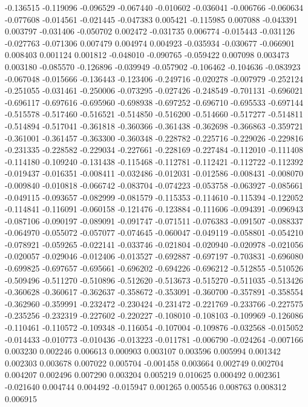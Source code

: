 -0.136515
-0.119096
-0.096529
-0.067440
-0.010602
-0.036041
-0.006766
-0.060634
-0.077608
-0.014561
-0.021445
-0.047383
0.005421
-0.115985
0.007088
-0.043391
0.003797
-0.031406
-0.050702
0.002472
-0.031735
0.006774
-0.015443
-0.031126
-0.027763
-0.071306
0.007479
0.004974
0.004923
-0.035934
-0.030677
-0.066901
0.008403
0.001124
0.001812
-0.048010
-0.090765
-0.059422
0.007098
0.003473
0.003180
-0.085570
-0.126896
-0.039949
-0.057902
-0.106462
-0.104636
-0.083923
-0.067048
-0.015666
-0.136443
-0.123406
-0.249716
-0.020278
-0.007979
-0.252124
-0.251055
-0.031461
-0.250006
-0.073295
-0.027426
-0.248549
-0.701131
-0.696021
-0.696117
-0.697616
-0.695960
-0.698938
-0.697252
-0.696710
-0.695533
-0.697144
-0.515578
-0.517460
-0.516521
-0.514850
-0.516200
-0.514660
-0.517277
-0.514811
-0.514894
-0.517041
-0.361818
-0.360366
-0.361438
-0.362698
-0.366863
-0.359721
-0.361001
-0.361457
-0.363300
-0.360348
-0.228782
-0.225716
-0.229026
-0.229816
-0.231335
-0.228582
-0.229034
-0.227661
-0.228169
-0.227484
-0.112010
-0.111408
-0.114180
-0.109240
-0.131438
-0.115468
-0.112781
-0.112421
-0.112722
-0.112392
-0.019437
-0.016351
-0.008411
-0.032486
-0.012031
-0.012586
-0.008431
-0.008070
-0.009840
-0.010818
-0.066742
-0.083704
-0.074223
-0.053758
-0.063927
-0.085661
-0.049115
-0.093657
-0.082999
-0.081579
-0.115353
-0.114610
-0.115394
-0.122052
-0.114841
-0.116091
-0.060158
-0.121476
-0.123884
-0.111606
-0.094391
-0.096943
-0.087106
-0.090197
-0.089091
-0.091747
-0.071511
-0.076383
-0.091507
-0.088337
-0.064970
-0.055072
-0.057077
-0.074645
-0.060047
-0.049119
-0.058801
-0.054210
-0.078921
-0.059265
-0.022141
-0.033746
-0.021804
-0.020940
-0.020978
-0.021056
-0.020057
-0.029046
-0.012406
-0.013527
-0.692887
-0.697197
-0.703831
-0.696080
-0.699825
-0.697657
-0.695661
-0.696202
-0.694226
-0.696212
-0.512855
-0.510526
-0.509496
-0.511270
-0.510896
-0.512620
-0.513673
-0.515270
-0.511035
-0.513426
-0.360628
-0.360617
-0.362637
-0.358672
-0.353091
-0.360700
-0.357891
-0.358554
-0.362960
-0.359991
-0.232472
-0.230424
-0.231472
-0.221769
-0.233766
-0.227575
-0.235256
-0.232319
-0.227602
-0.220227
-0.108010
-0.108103
-0.109969
-0.126086
-0.110461
-0.110572
-0.109348
-0.116054
-0.107004
-0.109876
-0.032568
-0.015052
-0.014433
-0.010773
-0.010436
-0.013223
-0.011781
-0.006790
-0.024264
-0.007166
0.003230
0.002246
0.006613
0.000903
0.003107
0.003596
0.005994
0.001342
0.002303
0.003678
0.007022
0.005704
-0.001458
0.003664
0.002749
0.002704
0.004207
0.002496
0.007290
0.003204
0.005219
0.010625
0.000492
0.002361
-0.021640
0.004744
0.004492
-0.015947
0.001265
0.005546
0.008763
0.008312
0.006915
